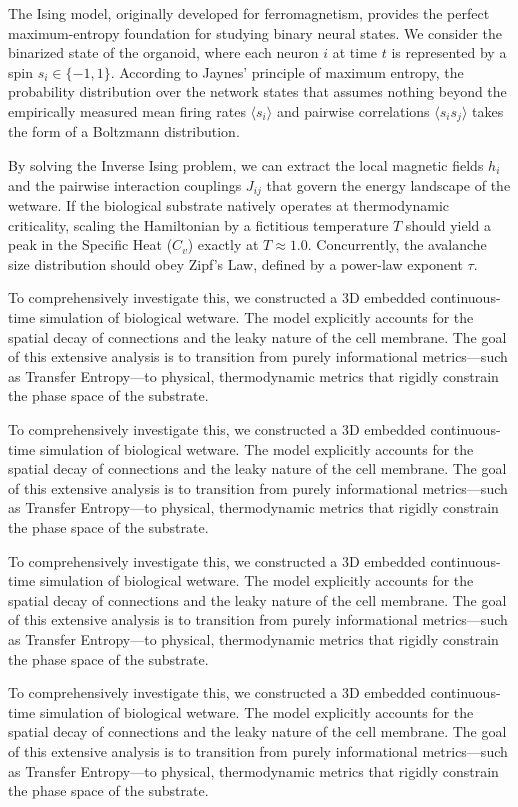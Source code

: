 \documentclass[11pt,a4paper]{article}
\begin{document}
The Ising model, originally developed for ferromagnetism, provides the perfect maximum-entropy foundation for studying binary neural states. We consider the binarized state of the organoid, where each neuron $i$ at time $t$ is represented by a spin $s_i \in \{-1, 1\}$. According to Jaynes' principle of maximum entropy, the probability distribution over the network states that assumes nothing beyond the empirically measured mean firing rates $\langle s_i \rangle$ and pairwise correlations $\langle s_i s_j \rangle$ takes the form of a Boltzmann distribution.

By solving the Inverse Ising problem, we can extract the local magnetic fields $h_i$ and the pairwise interaction couplings $J_{ij}$ that govern the energy landscape of the wetware. If the biological substrate natively operates at thermodynamic criticality, scaling the Hamiltonian by a fictitious temperature $T$ should yield a peak in the Specific Heat ($C_v$) exactly at $T \approx 1.0$. Concurrently, the avalanche size distribution should obey Zipf's Law, defined by a power-law exponent $\tau$.


To comprehensively investigate this, we constructed a 3D embedded continuous-time simulation of biological wetware. The model explicitly accounts for the spatial decay of connections and the leaky nature of the cell membrane. The goal of this extensive analysis is to transition from purely informational metrics—such as Transfer Entropy—to physical, thermodynamic metrics that rigidly constrain the phase space of the substrate.

To comprehensively investigate this, we constructed a 3D embedded continuous-time simulation of biological wetware. The model explicitly accounts for the spatial decay of connections and the leaky nature of the cell membrane. The goal of this extensive analysis is to transition from purely informational metrics—such as Transfer Entropy—to physical, thermodynamic metrics that rigidly constrain the phase space of the substrate.

To comprehensively investigate this, we constructed a 3D embedded continuous-time simulation of biological wetware. The model explicitly accounts for the spatial decay of connections and the leaky nature of the cell membrane. The goal of this extensive analysis is to transition from purely informational metrics—such as Transfer Entropy—to physical, thermodynamic metrics that rigidly constrain the phase space of the substrate.

To comprehensively investigate this, we constructed a 3D embedded continuous-time simulation of biological wetware. The model explicitly accounts for the spatial decay of connections and the leaky nature of the cell membrane. The goal of this extensive analysis is to transition from purely informational metrics—such as Transfer Entropy—to physical, thermodynamic metrics that rigidly constrain the phase space of the substrate.
\end{document}
